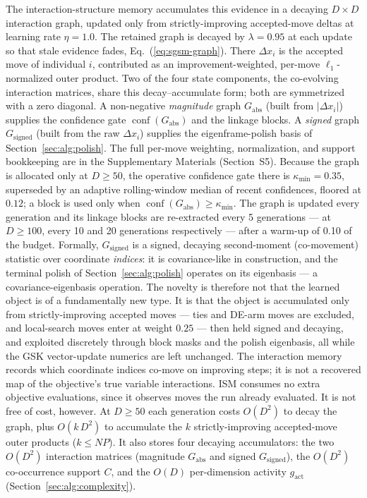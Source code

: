 The interaction-structure memory accumulates
this evidence in a decaying $D\times D$ interaction graph, updated
only from strictly-improving accepted-move deltas at learning rate $\eta=1.0$.
The retained graph is decayed by $\lambda=0.95$ at each update so that stale
evidence fades, Eq.~(\ref{eq:sgsm-graph}). There $\Delta x_i$ is the
accepted move of individual $i$, contributed as an improvement-weighted,
per-move $\ell_1$-normalized outer product. Two of the four state components, the co-evolving interaction
matrices, share this decay--accumulate form; both are symmetrized with a zero
diagonal. A non-negative \emph{magnitude} graph $G_{\mathrm{abs}}$ (built from
$|\Delta x_i|$) supplies the confidence gate $\operatorname{conf}(G_{\mathrm{abs}})$
and the linkage blocks. A \emph{signed} graph $G_{\mathrm{signed}}$
(built from the raw $\Delta x_i$) supplies the eigenframe-polish basis of
Section~\ref{sec:alg:polish}. The
full per-move weighting, normalization, and support bookkeeping are in the
Supplementary Materials (Section~S5). Because the graph is allocated only at
$D\ge50$, the operative confidence gate there is $\kappa_{\min}=0.35$,
superseded by an adaptive rolling-window median of recent confidences,
floored at $0.12$; a block is used only when
$\operatorname{conf}(G_{\mathrm{abs}})\ge\kappa_{\min}$. %
The graph is updated every generation and its linkage blocks are
re-extracted every 5 generations --- at $D\ge100$, every 10 and 20
generations respectively --- after a warm-up of 0.10 of the
budget. %
Formally, $G_{\mathrm{signed}}$ is a signed, decaying second-moment (co-movement)
statistic over coordinate \emph{indices}: it is covariance-like in
construction, and the terminal polish of
Section~\ref{sec:alg:polish} operates on its eigenbasis --- a
covariance-eigenbasis operation. The novelty is therefore not that the
learned object is of a fundamentally new type. It is that the object is
accumulated only from strictly-improving accepted moves --- ties and DE-arm
moves are excluded, and local-search moves enter at weight $0.25$ --- then held
signed and decaying, and exploited discretely through block masks and the polish
eigenbasis, all while the GSK vector-update numerics are left unchanged. The
interaction memory records which coordinate indices co-move on improving steps;
it is not a recovered map of the objective's true variable interactions.
ISM consumes no extra objective evaluations, since it observes moves the
run already evaluated. It is not free of cost, however. At $D \geq 50$ each
generation costs $O(D^{2})$ to decay the graph, plus $O(k\,D^{2})$ to
accumulate the $k$ strictly-improving accepted-move outer products ($k \leq NP$).
It also stores four decaying accumulators: the two $O(D^{2})$ interaction
matrices (magnitude $G_{\mathrm{abs}}$ and signed $G_{\mathrm{signed}}$), the
$O(D^{2})$ co-occurrence support $C$, and the $O(D)$ per-dimension activity
$g_{\mathrm{act}}$
(Section~\ref{sec:alg:complexity}). %


